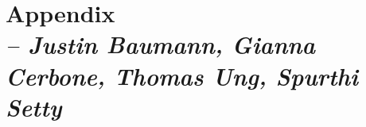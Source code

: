 \chapter{Appendix \\
\small{\textit{-- Justin Baumann, Gianna Cerbone, Thomas Ung, Spurthi Setty}}
\label{Chapter::Appendix}}